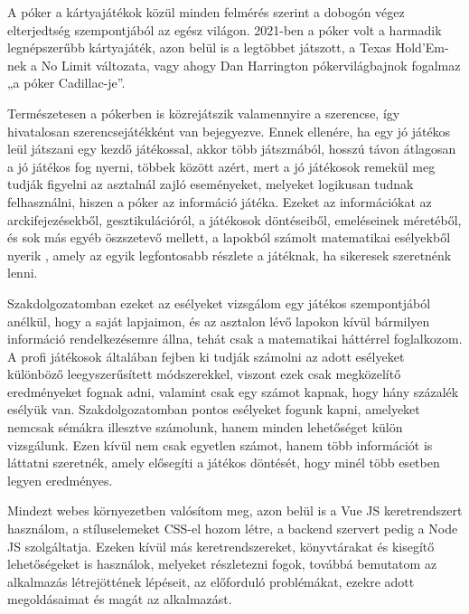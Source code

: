 
A póker a kártyajátékok közül minden felmérés szerint a dobogón végez elterjedtség szempontjából az egész világon. 2021-ben a póker volt a harmadik legnépszerűbb kártyajáték, azon belül is a legtöbbet játszott, a Texas Hold’Em-nek a No Limit változata, vagy ahogy Dan Harrington pókervilágbajnok fogalmaz „a póker Cadillac-je”\cite{harrington}. 

Természetesen a pókerben is közrejátszik valamennyire a szerencse, így hivatalosan szerencsejátékként van bejegyezve. %
Ennek ellenére, ha egy jó játékos leül játszani egy kezdő játékossal, akkor több játszmából, hosszú távon átlagosan a jó játékos fog nyerni, többek között azért, mert a jó játékosok remekül meg tudják figyelni az asztalnál zajló eseményeket, melyeket logikusan tudnak felhasználni, hiszen a póker az információ játéka. Ezeket az információkat az arckifejezésekből, gesztikulációról, a játékosok döntéseiből, emeléseinek méretéből, és sok más egyéb öszszetevő mellett, a lapokból számolt matematikai esélyekből nyerik , amely az egyik legfontosabb részlete a játéknak, ha sikeresek szeretnénk lenni.

Szakdolgozatomban ezeket az esélyeket vizsgálom egy játékos szempontjából anélkül, hogy a saját lapjaimon, és az asztalon lévő lapokon kívül bármilyen információ rendelkezésemre állna, tehát csak a matematikai háttérrel foglalkozom. A profi játékosok általában fejben ki tudják számolni az adott esélyeket különböző leegyszerűsített módszerekkel, viszont ezek csak megközelítő eredményeket fognak adni, valamint csak egy számot kapnak, hogy hány százalék esélyük van. Szakdolgozatomban pontos esélyeket fogunk kapni, amelyeket nemcsak sémákra illesztve számolunk, hanem minden lehetőséget külön vizsgálunk. Ezen kívül nem csak egyetlen számot, hanem több információt is láttatni szeretnék, amely elősegíti a játékos döntését, hogy minél több esetben legyen eredményes.

Mindezt webes környezetben valósítom meg, azon belül is a Vue JS keretrendszert használom, a stíluselemeket CSS-el hozom létre, a backend szervert pedig a Node JS szolgáltatja. Ezeken kívül más keretrendszereket, könyvtárakat és kisegítő lehetőségeket is használok, melyeket részletezni fogok, továbbá bemutatom az alkalmazás létrejöttének lépéseit, az előforduló problémákat, ezekre adott megoldásaimat és magát az alkalmazást.